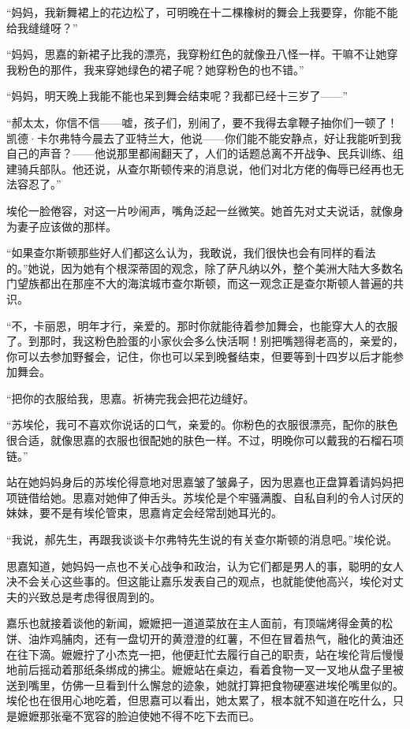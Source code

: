 \par “妈妈，我新舞裙上的花边松了，可明晚在十二棵橡树的舞会上我要穿，你能不能给我缝缝呀？”
\par “妈妈，思嘉的新裙子比我的漂亮，我穿粉红色的就像丑八怪一样。干嘛不让她穿我粉色的那件，我来穿她绿色的裙子呢？她穿粉色的也不错。”
\par “妈妈，明天晚上我能不能也呆到舞会结束呢？我都已经十三岁了——”
\par “郝太太，你信不信——嘘，孩子们，别闹了，要不我得去拿鞭子抽你们一顿了！凯德·卡尔弗特今晨去了亚特兰大，他说——你们能不能安静点，好让我能听到我自己的声音？——他说那里都闹翻天了，人们的话题总离不开战争、民兵训练、组建骑兵部队。他还说，从查尔斯顿传来的消息说，他们对北方佬的侮辱已经再也无法容忍了。”
\par 埃伦一脸倦容，对这一片吵闹声，嘴角泛起一丝微笑。她首先对丈夫说话，就像身为妻子应该做的那样。
\par “如果查尔斯顿那些好人们都这么认为，我敢说，我们很快也会有同样的看法的。”她说，因为她有个根深蒂固的观念，除了萨凡纳以外，整个美洲大陆大多数名门望族都出在那座不大的海滨城市查尔斯顿，而这一观念正是查尔斯顿人普遍的共识。
\par “不，卡丽恩，明年才行，亲爱的。那时你就能待着参加舞会，也能穿大人的衣服了。到那时，我这粉色脸蛋的小家伙会多么快活啊！别把嘴翘得老高的，亲爱的，你可以去参加野餐会，记住，你也可以呆到晚餐结束，但要等到十四岁以后才能参加舞会。
\par “把你的衣服给我，思嘉。祈祷完我会把花边缝好。
\par “苏埃伦，我可不喜欢你说话的口气，亲爱的。你粉色的衣服很漂亮，配你的肤色很合适，就像思嘉的衣服也很配她的肤色一样。不过，明晚你可以戴我的石榴石项链。”
\par 站在她妈妈身后的苏埃伦得意地对思嘉皱了皱鼻子，因为思嘉也正盘算着请妈妈把项链借给她。思嘉对她伸了伸舌头。苏埃伦是个牢骚满腹、自私自利的令人讨厌的妹妹，要不是有埃伦管束，思嘉肯定会经常刮她耳光的。
\par “我说，郝先生，再跟我谈谈卡尔弗特先生说的有关查尔斯顿的消息吧。”埃伦说。
\par 思嘉知道，她妈妈一点也不关心战争和政治，认为它们都是男人的事，聪明的女人决不会关心这些事的。但这能让嘉乐发表自己的观点，也就能使他高兴，埃伦对丈夫的兴致总是考虑得很周到的。
\par 嘉乐也就接着谈他的新闻，嬷嬷把一道道菜放在主人面前，有顶端烤得金黄的松饼、油炸鸡脯肉，还有一盘切开的黄澄澄的红薯，不但在冒着热气，融化的黄油还在往下滴。嬷嬷拧了小杰克一把，他便赶忙去履行自己的职责，站在埃伦背后慢慢地前后摇动着那纸条绑成的拂尘。嬷嬷站在桌边，看着食物一叉一叉地从盘子里被送到嘴里，仿佛一旦看到什么懈怠的迹象，她就打算把食物硬塞进埃伦嘴里似的。埃伦也在很用心地吃着，但思嘉可以看出，她太累了，根本就不知道在吃什么，只是嬷嬷那张毫不宽容的脸迫使她不得不吃下去而已。
